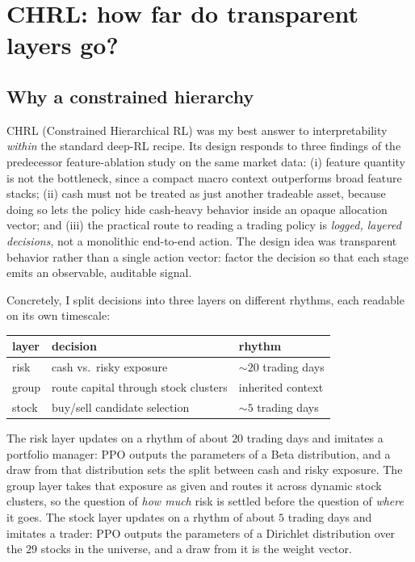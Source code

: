 \documentclass[11pt]{article}
\begin{document}
\section{CHRL: how far do transparent layers go?}
\label{sec:chrl}

\subsection{Why a constrained hierarchy}
\label{sec:chrlwhy}

CHRL (Constrained Hierarchical RL) was my best answer to interpretability \emph{within} the
standard deep-RL recipe. Its design responds to three findings of the predecessor
feature-ablation study on the same market data: (i) feature quantity is not the bottleneck, since
a compact macro context outperforms broad feature stacks; (ii) cash must not be treated as just
another tradeable asset, because doing so lets the policy hide cash-heavy behavior inside an
opaque allocation vector; and (iii) the practical route to reading a trading policy is
\emph{logged, layered decisions}, not a monolithic end-to-end action. The design idea was
transparent behavior rather than a single action vector: factor the decision so that each stage
emits an observable, auditable signal.

Concretely, I split decisions into three layers on different rhythms, each readable on its own
timescale:
\begin{center}\small
\begin{tabular}{lll}
\toprule
layer & decision & rhythm \\
\midrule
risk & cash vs.\ risky exposure & ${\sim}20$ trading days \\
group & route capital through stock clusters & inherited context \\
stock & buy/sell candidate selection & ${\sim}5$ trading days \\
\bottomrule
\end{tabular}
\end{center}

The risk layer updates on a rhythm of about $20$ trading days and imitates a portfolio manager: PPO outputs the parameters of a Beta distribution, and a
draw from that distribution sets the split between cash and risky exposure. The group layer takes
that exposure as given and routes it across dynamic stock clusters, so the question of \emph{how
much} risk is settled before the question of \emph{where} it goes. The stock layer updates on a
rhythm of about $5$ trading days and imitates a trader: PPO outputs the parameters of a Dirichlet
distribution over the $29$ stocks in the universe, and a draw from it is the weight vector.
\end{document}
